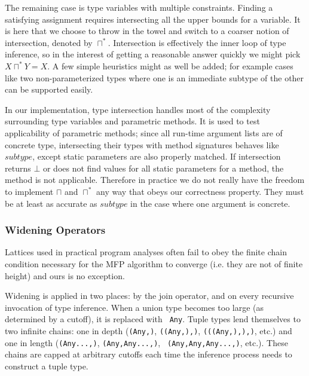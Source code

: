 \documentclass[9pt]{sigplanconf}
\begin{document}
The remaining case is type variables with multiple constraints. Finding
a satisfying assignment requires intersecting all the upper bounds for
a variable. It is here that we choose to throw in the towel and switch
to a coarser notion of intersection, denoted by $\sqcap^{*}$.
Intersection is effectively the inner loop of type inference, so in the
interest of getting a reasonable answer quickly we might pick
$X\sqcap^{*}Y=X$. A few simple heuristics might as well be added; for
example cases like two non-parameterized types where one is an immediate
subtype of the other can be supported easily.

In our implementation, type intersection handles most of the
complexity surrounding type variables and parametric methods. 
It is used to test applicability of parametric methods; since all
run-time argument lists are of concrete type, intersecting their types
with method signatures behaves like $subtype$, except static parameters
are also properly matched. If intersection returns $\bot$ or does not find
values for all static parameters for a method, the method is not applicable.
Therefore in practice we do not really have the freedom to implement
$\sqcap$ and $\sqcap^{*}$ any way that obeys our correctness property.
They must be at least as accurate as $subtype$ in the case where one
argument is concrete.


\subsubsection{Widening Operators}

Lattices used in practical program analyses often fail to obey the finite
chain condition necessary for the MFP algorithm to converge (i.e. they
are not of finite height) and ours is no exception.

Widening is applied in two places: by the join operator, and on every
recursive invocation of type inference.  When a union type becomes too
large (as determined by a cutoff), it is replaced with {\tt
  Any}. Tuple types lend themselves to two infinite chains: one in
depth ({\tt (Any,)}, {\tt ((Any,),)}, {\tt (((Any,),),)}, etc.)  and
one in length ({\tt (Any...,)}, {\tt (Any,Any...,)}, {\tt
  (Any,Any,Any...,)}, etc.). These chains are capped at arbitrary
cutoffs each time the inference process needs to construct a tuple
type.


\end{document}
